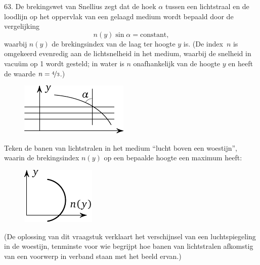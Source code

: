 \begin{problem}{63.}
	De brekingswet van Snellius zegt dat de hoek $\alpha$ tussen een lichtstraal en de loodlijn op het oppervlak van een gelaagd medium wordt bepaald door de vergelijking
	\begin{equation*}
		n(y) \sin \alpha = \text{constant},
	\end{equation*}
	waarbij $n(y)$ de brekingsindex van de laag ter hoogte $y$ is. (De index~$n$ is omgekeerd evenredig aan de lichtsnelheid in het medium, waarbij de snelheid in vacuüm op 1 wordt gesteld; in water is $n$ onafhankelijk van de hoogte $y$ en heeft de waarde $n=\nicefrac{4}{3}$.)
	\begin{figure}
		\null\hfill
		\includegraphics{resources/taskbook-47}
		\hfill\null
	\end{figure}

	Teken de banen van lichtstralen in het medium \enquote{lucht boven een woestijn}, waarin de brekingsindex $n(y)$ op een bepaalde hoogte een maximum heeft:
	\begin{figure}
		\null\hfill
		\includegraphics{resources/taskbook-471}
		\hfill\null
	\end{figure}

	(De oplossing van dit vraagstuk verklaart het verschijnsel van een luchtspiegeling in de woestijn, tenminste voor wie begrijpt hoe banen van lichtstralen afkomstig van een voorwerp in verband staan met het beeld ervan.)
\end{problem}

\clearpage

